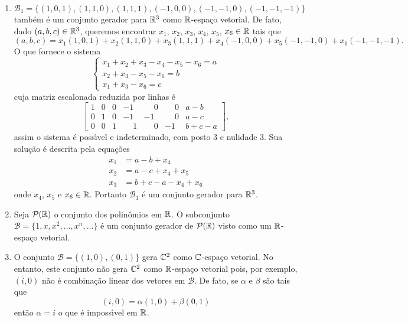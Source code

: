 \begin{exemplo}
\begin{enumerate}[label={\arabic*})]
	\[
		(a, b, c) = a(1, 0, 0) + b(0, 1, 0) + c(0, 0, 1).
	\]
	Assim qualquer vetor de $\real^3$ \'e uma combina\c{c}\~ao linear dos vetores $(1, 0 , 0)$, $(0, 1 , 0)$ e $(0, 0 , 1)$. Logo o conjunto $\mathcal{B} = \{(1, 0 , 0), (0, 1 , 0), (0, 0 , 1)\}$ \'e um conjunto gerador para $\real^3$.
	\item $\mathcal{B}_1 = \{(1, 0 , 1), (1, 1 , 0), (1, 1 , 1), (-1, 0, 0), (-1, -1, 0), (-1, -1, -1)\}$ tamb\'em \'e um conjunto gerador para $\real^3$ como $\mathbb{R}$-espa\c{c}o vetorial. De fato, dado $(a, b, c) \in \mathbb{R}^3$, queremos encontrar $x_1$, $x_2$, $x_3$, $x_4$, $x_5$, $x_6 \in \mathbb{R}$ tais que
	\[
		(a, b, c) = x_1(1, 0 , 1) + x_2(1, 1 , 0) + x_3(1, 1 , 1) + x_4(-1, 0, 0) + x_5(-1, -1, 0) + x_6(-1, -1, -1).
	\]
	O que fornece o sistema
	\[
		\begin{cases}
			x_1 + x_2 + x_3 - x_4 - x_5 - x_6 = a\\
			x_2 + x_3 - x_5 - x_6 = b\\
			x_1 + x_3 - x_6 = c
		\end{cases}
	\]
	cuja matriz escalonada reduzida por linhas \'e
	\[
		\begin{bmatrix}
			1 & 0 & 0 & -1 & \phantom{-}0 & \phantom{-}0 & a - b\\
			0 & 1 & 0 & -1 & -1 & \phantom{-}0 & a - c\\
			0 & 0 & 1 & \phantom{-}1 & \phantom{-}0 & -1 & b + c - a
		\end{bmatrix},
	\]
	assim o sistema \'e poss{\'\i}vel e indeterminado, com posto 3 e nulidade 3. Sua solu\c{c}\~ao \'e descrita pela equa\c{c}\~oes
	\begin{align*}
		x_1 &= a - b + x_4\\
		x_2 &= a - c + x_4 + x_5\\
		x_3 &= b + c - a - x_4 + x_6
	\end{align*}
	onde $x_4$, $x_5$ e $x_6 \in \mathbb{R}$. Portanto $\mathcal{B}_1$ \'e um conjunto gerador para $\real^3$.
	\item Seja $\mathcal{P}(\mathbb{R})$ o conjunto dos polin\^omios em $\mathbb{R}$. O subconjunto $\mathcal{B} = \{1, x, x^2, \dots, x^n, \dots\}$ \'e um conjunto gerador de $\mathcal{P}(\mathbb{R})$ visto como um $\mathbb{R}$-espa\c{c}o vetorial.
	\item O conjunto $\mathcal{B} = \{(1, 0), (0, 1)\}$ gera $\mathbb{C}^2$ como $\mathbb{C}$-espa\c{c}o vetorial. No entanto, este conjunto n\~ao gera $\mathbb{C}^2$ como $\mathbb{R}$-espa\c{c}o vetorial pois, por exemplo, $(i, 0)$ n\~ao \'e combina\c{c}\~ao linear dos vetores em $\mathcal{B}$. De fato, se $\alpha$ e $\beta$ s\~ao tais que
	\[
		(i, 0) = \alpha (1, 0) + \beta (0, 1)
	\]
	ent\~ao $\alpha = i$ o que \'e imposs{\'\i}vel em $\mathbb{R}$.
	\end{enumerate}
\end{exemplo}

